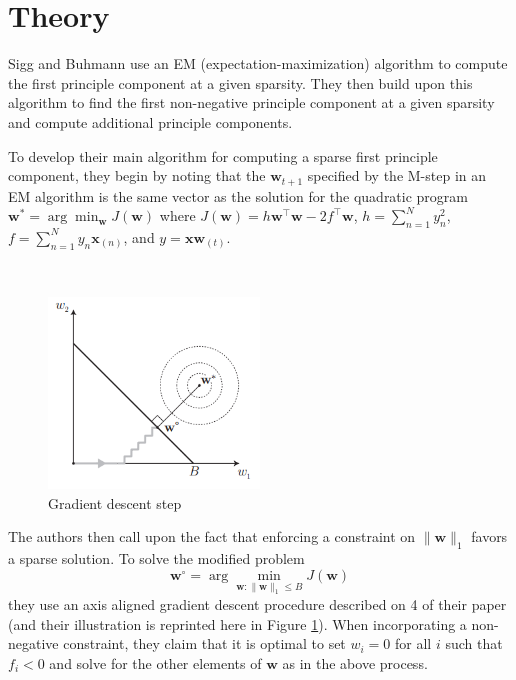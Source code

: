 \documentclass{article}
\begin{document}
\section{Theory}

Sigg and Buhmann use an EM (expectation-maximization) algorithm
to compute the first principle component at a given sparsity.
They then build upon this algorithm to find the first non-negative
principle component at a given sparsity and compute additional
principle components.

To develop their main algorithm for computing a sparse first principle
component, they begin by noting that the $\mathbf{w}_{t+1}$
specified by the M-step in an EM algorithm is the same vector as the
solution for the quadratic program
$\displaystyle\mathbf{w}^* = \arg\min_{\mathbf{w}} J(\mathbf{w})$
where $J(\mathbf{w}) = h \mathbf{w}^\intercal \mathbf{w}
  - 2 f^\intercal \mathbf{w}$,
$h = \sum_{n=1}^N y_n^2$,
$f = \sum_{n=1}^N y_n \mathbf{x}_{(n)}$,
and $y = \mathbf{x} \mathbf{w}_{(t)}$.

~

\begin{figure}
\caption{Gradient descent step}
\label{fig:gd}
\includegraphics[width=0.5\textwidth]{gd.png}
\end{figure}

The authors then call upon the fact that enforcing a constraint
on $\|\mathbf{w}\|_1$ favors a sparse solution.
To solve the modified problem
\[
\mathbf{w}^\circ = \arg\min_{
  \mathbf
{w} : \|\mathbf
{w}\|_1 \le B
} J(\mathbf{w})
\]
they use an axis aligned gradient descent procedure
described on 4 of their paper (and their illustration
is reprinted here in Figure \ref{fig:gd}).
When incorporating a non-negative constraint, they claim that it is
optimal to set $w_i = 0$ for all $i$ such that $f_i < 0$
and solve for the other elements of $\mathbf{w}$ as in the above process.
\end{document}
